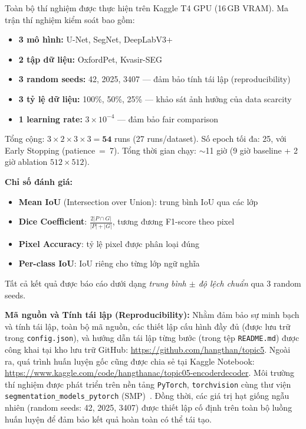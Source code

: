 \documentclass{article}
\begin{document}
Toàn bộ thí nghiệm được thực hiện trên Kaggle T4 GPU (16\,GB VRAM).
Ma trận thí nghiệm kiểm soát bao gồm:
\begin{itemize}
    \item \textbf{3 mô hình:} U-Net, SegNet, DeepLabV3+
    \item \textbf{2 tập dữ liệu:} OxfordPet, Kvasir-SEG
    \item \textbf{3 random seeds:} 42, 2025, 3407 --- đảm bảo tính tái lập (reproducibility)
    \item \textbf{3 tỷ lệ dữ liệu:} 100\%, 50\%, 25\% --- khảo sát ảnh hưởng của data scarcity
    \item \textbf{1 learning rate:} $3{\times}10^{-4}$ --- đảm bảo fair comparison
\end{itemize}

Tổng cộng: $3 \times 2 \times 3 \times 3 = \textbf{54}$ runs (27 runs/dataset).
Số epoch tối đa: 25, với Early Stopping (patience~=~7).
Tổng thời gian chạy: $\sim$11 giờ (9 giờ baseline + 2 giờ ablation $512{\times}512$).

\textbf{Chỉ số đánh giá:}
\begin{itemize}
    \item \textbf{Mean IoU} (Intersection over Union): trung bình IoU qua các lớp
    \item \textbf{Dice Coefficient}: $\frac{2|P \cap G|}{|P| + |G|}$, tương đương F1-score theo pixel
    \item \textbf{Pixel Accuracy}: tỷ lệ pixel được phân loại đúng
    \item \textbf{Per-class IoU}: IoU riêng cho từng lớp ngữ nghĩa
\end{itemize}

Tất cả kết quả được báo cáo dưới dạng \emph{trung bình $\pm$ độ lệch chuẩn} qua 3 random seeds.

\textbf{Mã nguồn và Tính tái lập (Reproducibility):}
Nhằm đảm bảo sự minh bạch và tính tái lập, toàn bộ mã nguồn, các thiết lập cấu hình đầy đủ (được lưu trữ trong \texttt{config.json}), và hướng dẫn tái lập từng bước (trong tệp \texttt{README.md}) được công khai tại kho lưu trữ GitHub: \url{https://github.com/hangthan/topic5}.
Ngoài ra, quá trình huấn luyện gốc cũng được chia sẻ tại Kaggle Notebook: \url{https://www.kaggle.com/code/hangthanac/topic05-encoderdecoder}.
Môi trường thí nghiệm được phát triển trên nền tảng \texttt{PyTorch}, \texttt{torchvision} cùng thư viện \texttt{segmentation\allowbreak\_models\allowbreak\_pytorch} (SMP)~\cite{iakubovskii2019smp}.
Đồng thời, các giá trị hạt giống ngẫu nhiên (random seeds: 42, 2025, 3407) được thiết lập cố định trên toàn bộ luồng huấn luyện để đảm bảo kết quả hoàn toàn có thể tái tạo.
\end{document}
